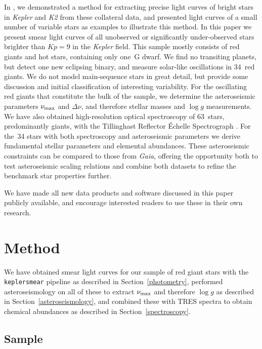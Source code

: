 \documentclass[a4paper,fleqn,usenatbib]{mnras}
\newcommand{\numax}{\mbox{$\nu_{\rm max}$}\xspace}
\newcommand{\Dnu}{\mbox{$\Delta \nu$}\xspace}
\newcommand{\logg}{\mbox{$\log g$}\xspace}
\newcommand{\kepler}{\textit{Kepler}\xspace}
\newcommand{\ktwo}{\textit{K2}\xspace}
\newcommand{\gaia}{\textit{Gaia}\xspace}
\begin{document}
In \citet{smear}, we demonstrated a method for extracting precise light curves of bright stars in \kepler and \ktwo from these collateral data, and presented light curves of a small number of variable stars as examples to illustrate this method. In this paper we present smear light curves of all unobserved or significantly under-observed stars brighter than $Kp=9$ in the \kepler field. This sample mostly consists of red giants and hot stars, containing only one~G dwarf. We find no transiting planets, but detect one new eclipsing binary, and measure solar-like oscillations in 34~red giants. We do not model main-sequence stars in great detail, but provide some discussion and initial classification of interesting variability. For the oscillating red giants that constitute the bulk of the sample, we determine the asteroseismic parameters \numax and \Dnu, and therefore stellar masses and \logg measurements. We have also obtained high-resolution optical spectroscopy of 63~stars, predominantly giants, with the Tillinghast Reflector \'{E}chelle Spectrograph \citep[TRES;][]{2007RMxAC..28..129S}. For the~34 stars with both spectroscopy and asteroseismic parameters we derive fundamental stellar parameters and elemental abundances. These asteroseismic constraints can be compared to those from \gaia, offering the opportunity both to test asteroseismic scaling relations and combine both datasets to refine the benchmark star properties further.

We have made all new data products and software discussed in this paper publicly available, and encourage interested readers to use these in their own research.   

\section{Method}
\label{method}

We have obtained smear light curves for our sample of red giant stars with the \texttt{keplersmear} pipeline as described in Section~\ref{photometry}, performed asteroseismology on all of these to extract \numax and therefore \logg as described in Section~\ref{asteroseismology}, and combined these with TRES spectra to obtain chemical abundances as described in Section~\ref{spectroscopy}. 

\subsection{Sample}
\label{sample}
\end{document}
